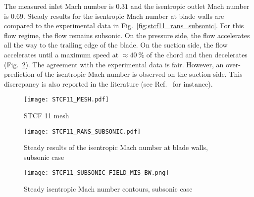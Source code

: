 
The measured inlet Mach number is $0.31$ and the isentropic outlet Mach number is $0.69$.
Steady results for the isentropic Mach number at blade walls are compared to the experimental data in 
Fig.~\ref{fig:stcf11_rans_subsonic}.  For this flow regime, the flow
remains subsonic.
On the pressure side, the flow accelerates all the way
to the trailing edge of the blade. On the suction side, the flow
accelerates until a maximum speed at $\approx 40~\%$ of the chord and
then decelerates (Fig.~\ref{fig:stcf11_subsonic_field_mis_bw}).
The agreement with the experimental data is fair. However, an
over-prediction of the isentropic Mach number is observed on the suction
side.  This discrepancy is also reported in the literature (see
Ref.~\cite{Fransson:1999uq} for instance).
\begin{figure}[htb]
  \centering
  \texttt{[image: STCF11\_MESH.pdf]}
  \caption{STCF 11 mesh}
  \label{fig:stcf11_mesh}
\end{figure}

\begin{figure}[htb]
  \centering
  \begin{minipage}[b]{.46\linewidth}
    \centering
    \texttt{[image: STCF11\_RANS\_SUBSONIC.pdf]}
    \caption{Steady results of the isentropic Mach number at blade
      walls, subsonic case}
    \label{fig:stcf11_rans_subsonic}
  \end{minipage}\quad
  \begin{minipage}[b]{.46\linewidth}
    \centering
    \texttt{[image: STCF11\_SUBSONIC\_FIELD\_MIS\_BW.png]}
    \caption{Steady isentropic Mach number contours, subsonic case}
    \label{fig:stcf11_subsonic_field_mis_bw}
  \end{minipage}
\end{figure}


